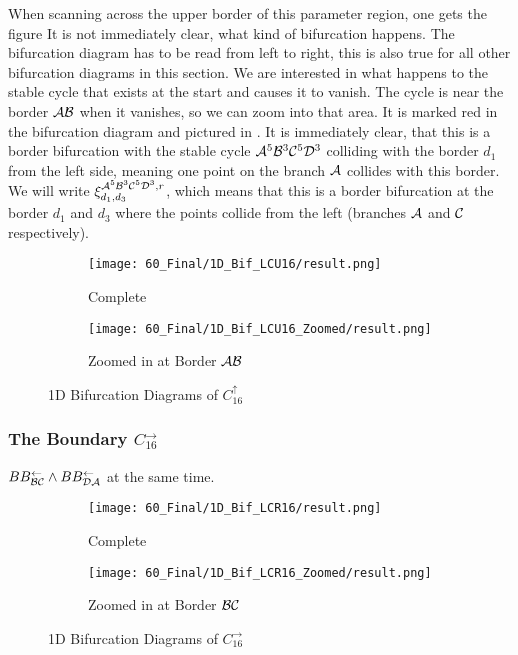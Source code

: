 When scanning across the upper border of this parameter region, one gets the figure 
It is not immediately clear, what kind of bifurcation happens.
The bifurcation diagram has to be read from left to right, this is also true for all other bifurcation diagrams in this section.
We are interested in what happens to the stable cycle that exists at the start and causes it to vanish.
The cycle is near the border $\mathcal{A}\mathcal{B}$ when it vanishes, so we can zoom into that area.
It is marked red in the bifurcation diagram and pictured in .
It is immediately clear, that this is a border bifurcation with the stable cycle $\mathcal{A}^5\mathcal{B}^3\mathcal{C}^5\mathcal{D}^3$ colliding with the border $d_1$ from the left side, meaning one point on the branch $\mathcal{A}$ collides with this border.
We will write $\xi_{d_1, d_3}^{\mathcal{A}^5\mathcal{B}^3\mathcal{C}^5\mathcal{D}^3, r}$, which means that this is a border bifurcation at the border $d_1$ and $d_3$ where the points collide from the left (branches $\mathcal{A}$ and $\mathcal{C}$ respectively).

\begin{figure}
    \centering
    \begin{subfigure}{0.4\textwidth}
        \centering
        \texttt{[image: 60\_Final/1D\_Bif\_LCU16/result.png]}
        \caption{Complete}
        \label{fig:final.bifurcation.C.up}
    \end{subfigure}
    \begin{subfigure}{0.4\textwidth}
        \centering
        \texttt{[image: 60\_Final/1D\_Bif\_LCU16\_Zoomed/result.png]}
        \caption{Zoomed in at Border $\mathcal{A}\mathcal{B}$}
        \label{fig:bifurcation.C.up.zoomed}
    \end{subfigure}
    \caption{1D Bifurcation Diagrams of $C_{16}^\uparrow$}
\end{figure}

\subsubsection{The Boundary $C_{16}^\rightarrow$}

$BB_{\mathcal{B}\mathcal{C}}^\leftarrow \land BB_{\mathcal{D}\mathcal{A}}^\leftarrow$ at the same time.

\begin{figure}
    \centering
    \begin{subfigure}{0.4\textwidth}
        \centering
        \texttt{[image: 60\_Final/1D\_Bif\_LCR16/result.png]}
        \caption{Complete}
        \label{fig:final.bifurcation.C.right}
    \end{subfigure}
    \begin{subfigure}{0.4\textwidth}
        \centering
        \texttt{[image: 60\_Final/1D\_Bif\_LCR16\_Zoomed/result.png]}
        \caption{Zoomed in at Border $\mathcal{B}\mathcal{C}$}
        \label{fig:final.bifurcation.C.right.zoomed}
    \end{subfigure}
    \caption{1D Bifurcation Diagrams of $C_{16}^\rightarrow$}
\end{figure}

